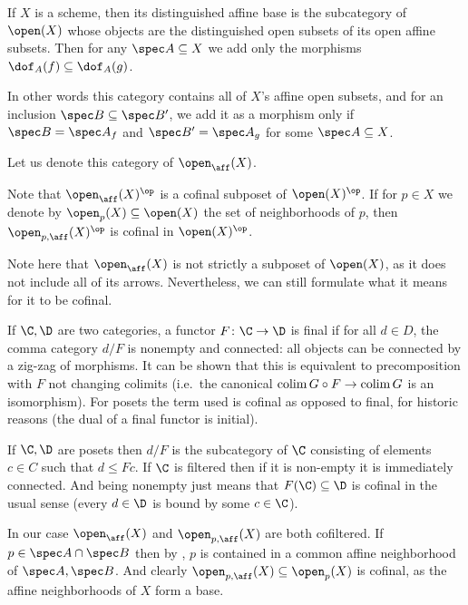 \bdefn

    If $X$ is a scheme, then its {\emphcolor distinguished affine base} is the subcategory of $\open(X)$ whose objects are the distinguished open subsets of its open affine subsets.
    Then for any $\spec A\subseteq X$ we add only the morphisms $\dof_A(f)\subseteq\dof_A(g)$.

    In other words this category contains all of $X$'s affine open subsets, and for an inclusion $\spec B\subseteq\spec B'$, we add it as a morphism only if $\spec B=\spec A_f$ and $\spec B'=\spec A_g$
    for some $\spec A\subseteq X$.

    Let us denote this category of $\open_\aff(X)$.

\edefn

Note that $\open_\aff(X)^\op$ is a cofinal subposet of $\open(X)^\op$.
If for $p\in X$ we denote by $\open_p(X)\subseteq\open(X)$ the set of neighborhoods of $p$, then $\open_{p,\aff}(X)^\op$ is cofinal in $\open(X)^\op$.

\bremark

    Note here that $\open_\aff(X)$ is not strictly a subposet of $\open(X)$, as it does not include all of its arrows.
    Nevertheless, we can still formulate what it means for it to be cofinal.

    If $\C,\D$ are two categories, a functor $F\colon\C\to\D$ is {\emphcolor final} if for all $d\in D$, the comma category $d/F$ is nonempty and {\emphcolor connected}: all objects can be
    connected by a zig-zag of morphisms.
    It can be shown that this is equivalent to precomposition with $F$ not changing colimits (i.e.\ the canonical $\mathop{\rm colim}\nolimits G\circ F\to\mathop{\rm colim}\nolimits G$ is an isomorphism).
    For posets the term used is {\emphcolor cofinal} as opposed to final, for historic reasons (the dual of a final functor is {\emphcolor initial}).

    If $\C,\D$ are posets then $d/F$ is the subcategory of $\C$ consisting of elements $c\in C$ such that $d\leq Fc$.
    If $\C$ is filtered then if it is non-empty it is immediately connected.
    And being nonempty just means that $F(\C)\subseteq\D$ is cofinal in the usual sense (every $d\in\D$ is bound by some $c\in\C$).

    In our case $\open_\aff(X)$ and $\open_{p,\aff}(X)$ are both cofiltered.
    If $p\in\spec A\cap\spec B$ then by , $p$ is contained in a common affine neighborhood of $\spec A,\spec B$.
    And clearly $\open_{p,\aff}(X)\subseteq\open_p(X)$ is cofinal, as the affine neighborhoods of $X$ form a base.

